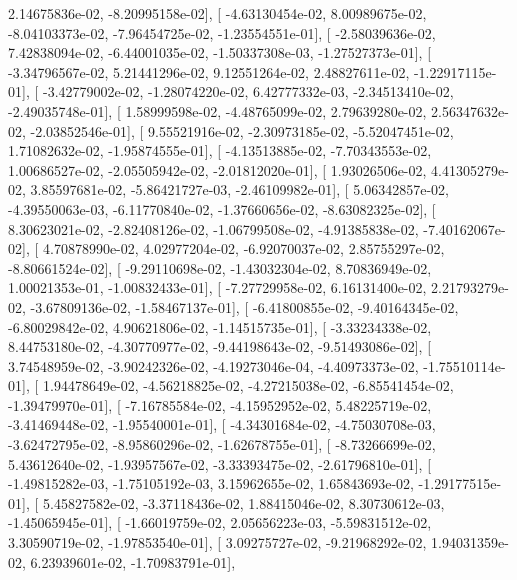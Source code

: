 \documentclass{article}
\begin{document}
          2.14675836e-02,  -8.20995158e-02],
       [ -4.63130454e-02,   8.00989675e-02,  -8.04103373e-02,
         -7.96454725e-02,  -1.23554551e-01],
       [ -2.58039636e-02,   7.42838094e-02,  -6.44001035e-02,
         -1.50337308e-03,  -1.27527373e-01],
       [ -3.34796567e-02,   5.21441296e-02,   9.12551264e-02,
          2.48827611e-02,  -1.22917115e-01],
       [ -3.42779002e-02,  -1.28074220e-02,   6.42777332e-03,
         -2.34513410e-02,  -2.49035748e-01],
       [  1.58999598e-02,  -4.48765099e-02,   2.79639280e-02,
          2.56347632e-02,  -2.03852546e-01],
       [  9.55521916e-02,  -2.30973185e-02,  -5.52047451e-02,
          1.71082632e-02,  -1.95874555e-01],
       [ -4.13513885e-02,  -7.70343553e-02,   1.00686527e-02,
         -2.05505942e-02,  -2.01812020e-01],
       [  1.93026506e-02,   4.41305279e-02,   3.85597681e-02,
         -5.86421727e-03,  -2.46109982e-01],
       [  5.06342857e-02,  -4.39550063e-03,  -6.11770840e-02,
         -1.37660656e-02,  -8.63082325e-02],
       [  8.30623021e-02,  -2.82408126e-02,  -1.06799508e-02,
         -4.91385838e-02,  -7.40162067e-02],
       [  4.70878990e-02,   4.02977204e-02,  -6.92070037e-02,
          2.85755297e-02,  -8.80661524e-02],
       [ -9.29110698e-02,  -1.43032304e-02,   8.70836949e-02,
          1.00021353e-01,  -1.00832433e-01],
       [ -7.27729958e-02,   6.16131400e-02,   2.21793279e-02,
         -3.67809136e-02,  -1.58467137e-01],
       [ -6.41800855e-02,  -9.40164345e-02,  -6.80029842e-02,
          4.90621806e-02,  -1.14515735e-01],
       [ -3.33234338e-02,   8.44753180e-02,  -4.30770977e-02,
         -9.44198643e-02,  -9.51493086e-02],
       [  3.74548959e-02,  -3.90242326e-02,  -4.19273046e-04,
         -4.40973373e-02,  -1.75510114e-01],
       [  1.94478649e-02,  -4.56218825e-02,  -4.27215038e-02,
         -6.85541454e-02,  -1.39479970e-01],
       [ -7.16785584e-02,  -4.15952952e-02,   5.48225719e-02,
         -3.41469448e-02,  -1.95540001e-01],
       [ -4.34301684e-02,  -4.75030708e-03,  -3.62472795e-02,
         -8.95860296e-02,  -1.62678755e-01],
       [ -8.73266699e-02,   5.43612640e-02,  -1.93957567e-02,
         -3.33393475e-02,  -2.61796810e-01],
       [ -1.49815282e-03,  -1.75105192e-03,   3.15962655e-02,
          1.65843693e-02,  -1.29177515e-01],
       [  5.45827582e-02,  -3.37118436e-02,   1.88415046e-02,
          8.30730612e-03,  -1.45065945e-01],
       [ -1.66019759e-02,   2.05656223e-03,  -5.59831512e-02,
          3.30590719e-02,  -1.97853540e-01],
       [  3.09275727e-02,  -9.21968292e-02,   1.94031359e-02,
          6.23939601e-02,  -1.70983791e-01],
\end{document}
